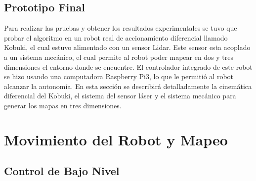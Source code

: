 \subsection{Prototipo Final}
Para realizar las pruebas y obtener los resultados experimentales se tuvo que probar
el algoritmo en un robot real de accionamiento diferencial llamado Kobuki, el cual estuvo 
alimentado con un sensor Lidar. Este sensor esta acoplado a un sistema mec\'anico, el cual
permite al robot poder mapear en dos y tres dimensiones el entorno donde se encuentre. El 
controlador integrado de este robot se hizo usando una computadora Raspberry Pi3, lo que le
permiti\'o al robot alcanzar la autonom\'ia. En esta secci\'on se describir\'a detalladamente
la cinem\'atica diferencial del Kobuki, el sistema del sensor l\'aser y el sistema mec\'anico 
para generar los mapas en tres dimensiones.

\section{Movimiento del Robot y Mapeo}

\subsection{Control de Bajo Nivel}


